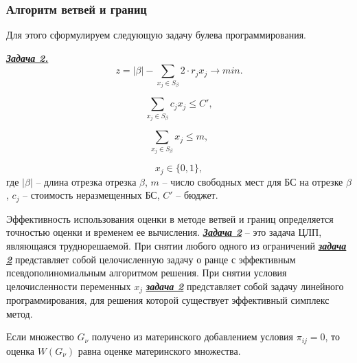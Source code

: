 \begin{frame}
    
    \frametitle{Алгоритм ветвей и границ}
    \fontsize{8pt}{7.2}\selectfont
    Для этого сформулируем следующую задачу булева программирования.

    \underline{\textit{\textbf{Задача 2.}}}
    \begin{displaymath}\label{present:task2}
        z = |\beta| - \sum\limits_{x_j \in S_\beta} 2 \cdot r_j x_j \rightarrow min.
    \end{displaymath}

    \begin{displaymath}\label{eq:part4_task2_cost}
        \sum\limits_{x_j \in S_\beta} c_j x_j \leqslant C',
    \end{displaymath}

    \begin{displaymath}\label{eq:part4_task2_m}
        \sum\limits_{x_j \in S_\beta} x_j \leqslant m,
    \end{displaymath}

    \begin{displaymath}
        x_j \in \{0, 1\},
    \end{displaymath}
    где $|\beta|$ -- длина отрезка отрезка  $\beta$, $m$ -- число свободных мест для БС на отрезке $\beta$, $c_j$ -- стоимость неразмещенных БС, $C'$ -- бюджет.

    \bigskip
    Эффективность использования оценки в методе ветвей и границ определяется точностью оценки и временем ее вычисления. \underline{\textit{\textbf{Задача 2}}} -- это задача ЦЛП, являющаяся труднорешаемой. При снятии любого одного из ограничений \underline{\textit{\textbf{задача 2}}} представляет собой целочисленную задачу о ранце с эффективным псевдополиномиальным алгоритмом решения. При снятии условия целочисленности переменных $x_j$ \underline{\textit{\textbf{задача 2}}} представляет собой задачу линейного программирования, для решения которой существует эффективный симплекс метод.
 
    \bigskip
    Если множество $G_\nu$ получено из материнского добавлением условия $\pi_{ij}=0$, то оценка $W(G_\nu)$ равна оценке материнского множества.

\end{frame}


